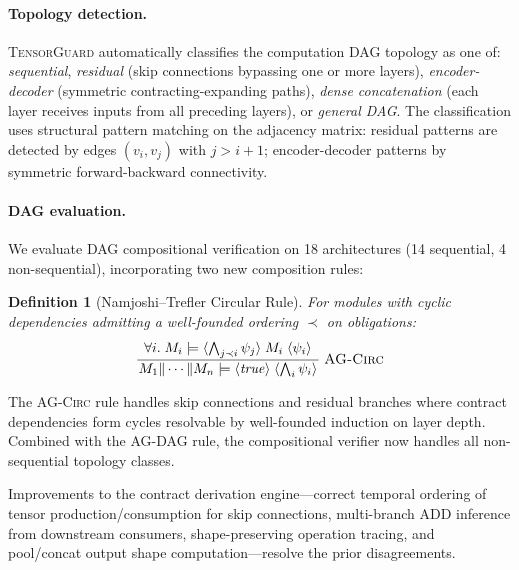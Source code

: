 \documentclass[11pt]{article}
\newtheorem{definition}[theorem]{Definition}
\begin{document}
\paragraph{Topology detection.}
\textsc{TensorGuard} automatically classifies the computation DAG
topology as one of: \emph{sequential}, \emph{residual}
(skip connections bypassing one or more layers), \emph{encoder-decoder}
(symmetric contracting-expanding paths), \emph{dense concatenation}
(each layer receives inputs from all preceding layers), or
\emph{general DAG}.  The classification uses structural pattern matching
on the adjacency matrix: residual patterns are detected by edges
$(v_i, v_j)$ with $j > i + 1$; encoder-decoder patterns by
symmetric forward-backward connectivity.

\paragraph{DAG evaluation.}
We evaluate DAG compositional verification on 18 architectures
(14 sequential, 4 non-sequential), incorporating two new
composition rules:

\begin{definition}[Namjoshi--Trefler Circular Rule]\label{def:ag-circ}
For modules with cyclic dependencies admitting a well-founded
ordering $\prec$ on obligations:
\[
\frac{
  \begin{array}{c}
  \forall i.\;
  M_i \models
  \langle \bigwedge_{j \prec i} \psi_j \rangle\; M_i \;\langle \psi_i \rangle
  \end{array}
}{
  M_1 \| \cdots \| M_n \models \langle \mathit{true} \rangle \;\langle \bigwedge_i \psi_i \rangle
}
\;\textsc{AG-Circ}
\]
\end{definition}

\noindent The \textsc{AG-Circ} rule handles skip connections and
residual branches where contract dependencies form cycles resolvable
by well-founded induction on layer depth.  Combined with the
\textsc{AG-DAG} rule, the compositional verifier now handles
all non-sequential topology classes.

Improvements to the contract derivation engine---correct temporal
ordering of tensor production/consumption for skip connections,
multi-branch ADD inference from downstream consumers, shape-preserving
operation tracing, and pool/concat output shape computation---resolve
the prior disagreements.
\end{document}
